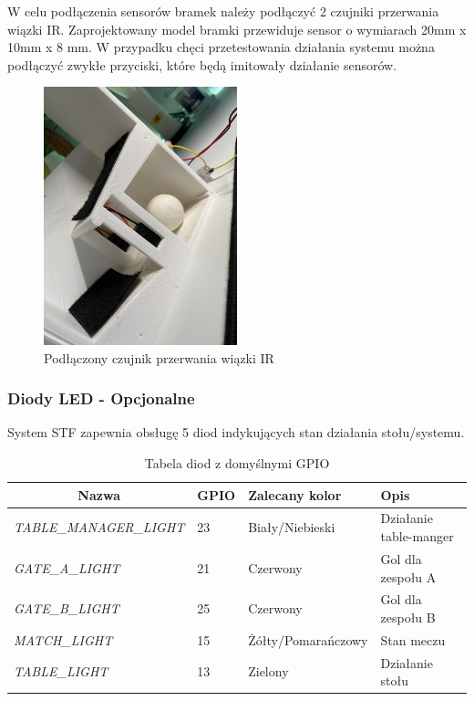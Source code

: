 W celu podłączenia sensorów bramek należy podłączyć 2 czujniki przerwania wiązki IR. Zaprojektowany model bramki przewiduje sensor o wymiarach 20mm x 10mm x 8 mm. W przypadku chęci przetestowania działania systemu można podłączyć zwykłe przyciski, które będą imitowały działanie sensorów.


\begin{figure}[h!]
  \centering
    \includegraphics[width=0.5\textwidth]{images/hardware/sensor.jpg}
  \caption{Podłączony czujnik przerwania wiązki IR}
  \label{fig:mobile}
\end{figure}


\subsubsection{Diody LED - Opcjonalne}
System STF zapewnia obsługę 5 diod indykujących stan działania stołu/systemu.

\begin{table}[h!]
\centering
\begin{tabular}{|l|l|l|l|}
\hline
\multicolumn{1}{|c|}{\textbf{Nazwa}} & \multicolumn{1}{c|}{\textbf{GPIO}} & \textbf{Zalecany kolor} & \textbf{Opis} \\ \hline
\textit{TABLE\_MANAGER\_LIGHT} & 23 & Biały/Niebieski & Działanie table-manger \\ \hline
\textit{GATE\_A\_LIGHT} & 21 & Czerwony & Gol dla zespołu A \\ \hline
\textit{GATE\_B\_LIGHT} & 25 & Czerwony & Gol dla zespołu B \\ \hline
\textit{MATCH\_LIGHT} & 15 & Żółty/Pomarańczowy & Stan meczu \\ \hline
\textit{TABLE\_LIGHT} & 13 & Zielony & Działanie stołu \\ \hline
\end{tabular}
\caption{Tabela diod z domyślnymi GPIO}
\end{table}

